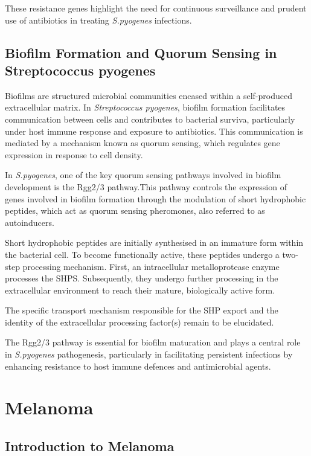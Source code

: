 \documentclass[
]{article}
\begin{document}
These resistance genes highlight the need for continuous surveillance
and prudent use of antibiotics in treating \emph{S.pyogenes} infections.

\subsection{Biofilm Formation and Quorum Sensing in Streptococcus
pyogenes}\label{biofilm-formation-and-quorum-sensing-in-streptococcus-pyogenes}

Biofilms are structured microbial communities encased within a
self-produced extracellular matrix. In \emph{Streptococcus pyogenes},
biofilm formation facilitates communication between cells and
contributes to bacterial surviva, particularly under host immune
response and exposure to antibiotics. This communication is mediated by
a mechanism known as quorum sensing, which regulates gene expression in
response to cell density.

In \emph{S.pyogenes}, one of the key quorum sensing pathways involved in
biofilm development is the Rgg2/3 pathway.This pathway controls the
expression of genes involved in biofilm formation through the modulation
of short hydrophobic peptides, which act as quorum sensing pheromones,
also referred to as autoinducers.

Short hydrophobic peptides are initially synthesised in an immature form
within the bacterial cell. To become functionally active, these peptides
undergo a two-step processing mechanism. First, an intracellular
metalloprotease enzyme processes the SHPS. Subsequently, they undergo
further processing in the extracellular environment to reach their
mature, biologically active form.

The specific transport mechanism responsible for the SHP export and the
identity of the extracellular processing factor(s) remain to be
elucidated.

The Rgg2/3 pathway is essential for biofilm maturation and plays a
central role in \emph{S.pyogenes} pathogenesis, particularly in
facilitating persistent infections by enhancing resistance to host
immune defences and antimicrobial agents.

\newpage

\section{Melanoma}\label{melanoma}

\subsection{Introduction to Melanoma}\label{introduction-to-melanoma}
\end{document}
